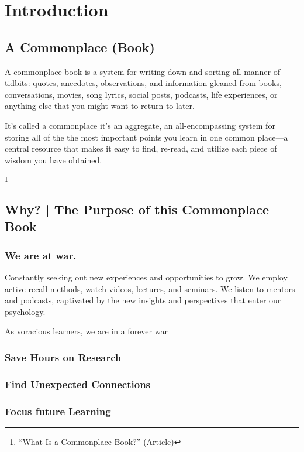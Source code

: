 \chapter{Introduction}

\section{A Commonplace (Book) }

A commonplace book is a system for writing down and sorting all manner of tidbits: quotes, anecdotes, observations, and information gleaned from books, conversations, movies, song lyrics, social posts, podcasts, life experiences, or anything else that you might want to return to later.

It's called a commonplace it's an aggregate, an all-encompassing system for storing all of the the most important points you learn in  one common place—a central resource that makes it easy to find, re-read, and utilize each piece of wisdom you have obtained.


\footnote{\href{https://www.masterclass.com/articles/how-to-keep-a-commonplace-book\#who-uses-commonplacing}{``What Is a Commonplace Book?'' (Article)} }

\section*{Why? | The Purpose of this Commonplace Book}

\subsection{We are at war.}

Constantly seeking out new experiences and opportunities to grow. We employ active recall methods, watch videos, lectures, and seminars. We listen to mentors and podcasts, captivated by the new insights and perspectives that enter our psychology.

As voracious learners, we are in a forever war

\subsection{Save Hours on Research}

\subsection{Find Unexpected Connections}

\subsection{Focus future Learning}

